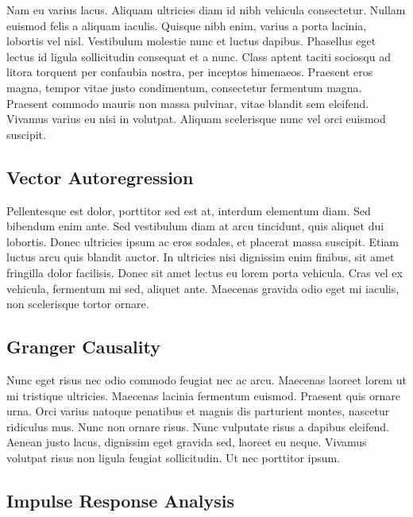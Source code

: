 \documentclass{article}
\begin{document}
Nam eu varius lacus. Aliquam ultricies diam id nibh vehicula
consectetur. Nullam euismod felis a aliquam iaculis. Quisque nibh enim,
varius a porta lacinia, lobortis vel nisl. Vestibulum molestie nunc et
luctus dapibus. Phasellus eget lectus id ligula sollicitudin consequat
et a nunc. Class aptent taciti sociosqu ad litora torquent per confaubia
nostra, per inceptos himenaeos. Praesent eros magna, tempor vitae justo
condimentum, consectetur fermentum magna. Praesent commodo mauris non
massa pulvinar, vitae blandit sem eleifend. Vivamus varius eu nisi in
volutpat. Aliquam scelerisque nunc vel orci euismod suscipit.


\hypertarget{vector-autoregression}{%
\subsection{Vector Autoregression}\label{vector-autoregression}}

Pellentesque est dolor, porttitor sed est at, interdum elementum diam.
Sed bibendum enim ante. Sed vestibulum diam at arcu tincidunt, quis
aliquet dui lobortis. Donec ultricies ipsum ac eros sodales, et placerat
massa suscipit. Etiam luctus arcu quis blandit auctor. In ultricies nisi
dignissim enim finibus, sit amet fringilla dolor facilisis. Donec sit
amet lectus eu lorem porta vehicula. Cras vel ex vehicula, fermentum mi
sed, aliquet ante. Maecenas gravida odio eget mi iaculis, non
scelerisque tortor ornare.

\hypertarget{granger-causality}{%
\subsection{Granger Causality}\label{granger-causality}}

Nunc eget risus nec odio commodo feugiat nec ac arcu. Maecenas laoreet
lorem ut mi tristique ultricies. Maecenas lacinia fermentum euismod.
Praesent quis ornare urna. Orci varius natoque penatibus et magnis dis
parturient montes, nascetur ridiculus mus. Nunc non ornare risus. Nunc
vulputate risus a dapibus eleifend. Aenean justo lacus, dignissim eget
gravida sed, laoreet eu neque. Vivamus volutpat risus non ligula feugiat
sollicitudin. Ut nec porttitor ipsum.

\hypertarget{impulse-response-analysis}{%
\subsection{Impulse Response Analysis}\label{impulse-response-analysis}}
\end{document}
